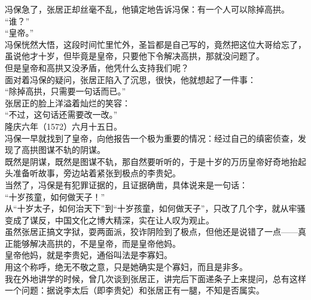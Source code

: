 \begin{multicols}{\theparacolNo}
冯保急了，张居正却丝毫不乱，他镇定地告诉冯保：有一个人可以除掉高拱。\\

“谁？”\\

“皇帝。”\\

冯保恍然大悟，这段时间忙里忙外，圣旨都是自己写的，竟然把这位大哥给忘了，虽说他才十岁，但毕竟是皇帝，只要他下令解决高拱，那就没问题了。\\

但是皇帝和高拱又没矛盾，他凭什么支持我们呢？\\

面对着冯保的疑问，张居正陷入了沉思，很快，他就想起了一件事：\\

“除掉高拱，只需要一句话而已。”\\

张居正的脸上洋溢着灿烂的笑容：\\

“不过，这句话还需要改一改。”\\

隆庆六年（1572）六月十五日。\\

冯保一早就找到了皇帝，向他报告一个极为重要的情况：经过自己的缜密侦查，发现了高拱图谋不轨的阴谋。\\

既然是阴谋，既然是图谋不轨，那自然要听听的，于是十岁的万历皇帝好奇地抬起头准备听故事，旁边站着紧张到极点的李贵妃。\\

当然了，冯保是有犯罪证据的，且证据确凿，具体说来是一句话：\\

“十岁孩童，如何做天子！”\\

从“十岁太子，如何治天下”到“十岁孩童，如何做天子”，只改了几个字，就从牢骚变成了谋反，中国文化之博大精深，实在让人叹为观止。\\

虽然张居正搞文字狱，耍两面派，狡诈阴险到了极点，但他还是说错了一点——真正能够解决高拱的，不是皇帝，而是皇帝他妈。\\

皇帝他妈，就是李贵妃，通俗叫法是李寡妇。\\

用这个称呼，绝无不敬之意，只是她确实是个寡妇，而且是非多。\\

我在外地讲学的时候，曾几次谈到张居正，讲完后下面递条子上来提问，总有这样一个问题：据说李太后（即李贵妃）和张居正有一腿，不知是否属实。\\


\end{multicols}
